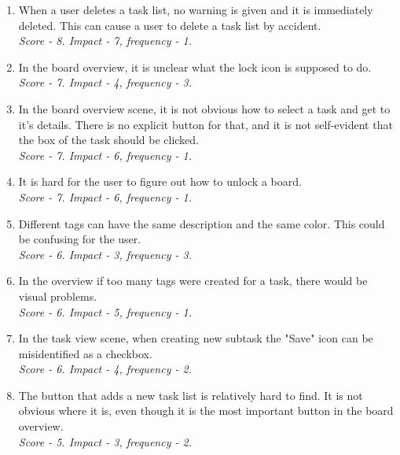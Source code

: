 \begin{enumerate}
  \item When a user deletes a task list, no warning is given and it is immediately deleted. This can cause a user to delete a task list by accident. 
  \\ \emph{Score - 8. Impact - 7, frequency - 1.} \\

  \item In the board overview, it is unclear what the lock icon is supposed to do.
  \\ \emph{Score - 7. Impact - 4, frequency - 3.} \\
  
  \item In the board overview scene, it is not obvious how to select a task and get to it's details. There is no explicit button for that, and it is not self-evident that the box of the task should be clicked.
  \\ \emph{Score - 7. Impact - 6, frequency - 1.} \\

  \item It is hard for the user to figure out how to unlock a board.
  \\ \emph{Score - 7. Impact - 6, frequency - 1.} \\
  
   \item Different tags can have the same description and the same color. This could be confusing for the user.
  \\ \emph{Score - 6. Impact - 3, frequency - 3.} \\
    
  \item In the overview if too many tags were created for a task, there would be visual problems.
  \\ \emph{Score - 6. Impact - 5, frequency - 1.} \\
  
  \item In the task view scene, when creating new subtask the "Save" icon can be misidentified as a checkbox.
  \\ \emph{Score - 6. Impact - 4, frequency - 2.} \\
 
  \item The button that adds a new task list is relatively hard to find. It is not obvious where it is, even though it is the most important button in the board overview.
  \\ \emph{Score - 5. Impact - 3, frequency - 2.} \\
  

\end{enumerate}
